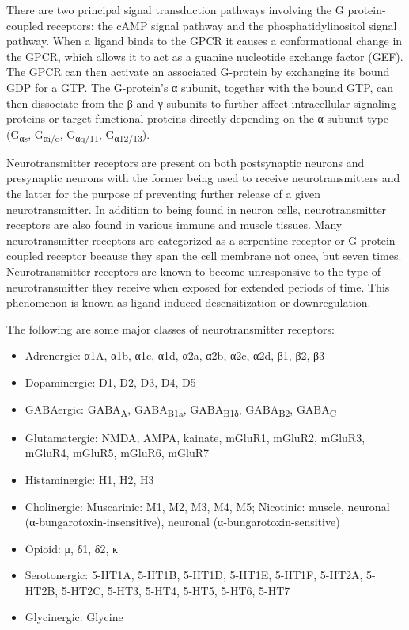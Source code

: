 There are two principal signal transduction pathways involving the G protein-coupled receptors: the cAMP signal pathway and the phosphatidylinositol signal pathway. When a ligand binds to the GPCR it causes a conformational change in the GPCR, which allows it to act as a guanine nucleotide exchange factor (GEF). The GPCR can then activate an associated G-protein by exchanging its bound GDP for a GTP. The G-protein's α subunit, together with the bound GTP, can then dissociate from the β and γ subunits to further affect intracellular signaling proteins or target functional proteins directly depending on the α subunit type (G\textsubscript{αs}, G\textsubscript{αi/o}, G\textsubscript{αq/11}, G\textsubscript{α12/13}).

Neurotransmitter receptors are present on both postsynaptic neurons and presynaptic neurons with the former being used to receive neurotransmitters and the latter for the purpose of preventing further release of a given neurotransmitter. In addition to being found in neuron cells, neurotransmitter receptors are also found in various immune and muscle tissues. Many neurotransmitter receptors are categorized as a serpentine receptor or G protein-coupled receptor because they span the cell membrane not once, but seven times. Neurotransmitter receptors are known to become unresponsive to the type of neurotransmitter they receive when exposed for extended periods of time. This phenomenon is known as ligand-induced desensitization or downregulation.

The following are some major classes of neurotransmitter receptors:

\begin{itemize}
\tightlist
\item
  Adrenergic: α1A, α1b, α1c, α1d, α2a, α2b, α2c, α2d, β1, β2, β3
\item
  Dopaminergic: D1, D2, D3, D4, D5
\item
  GABAergic: GABA\textsubscript{A}, GABA\textsubscript{B1a}, GABA\textsubscript{B1δ}, GABA\textsubscript{B2}, GABA\textsubscript{C}
\item
  Glutamatergic: NMDA, AMPA, kainate, mGluR1, mGluR2, mGluR3, mGluR4, mGluR5, mGluR6, mGluR7
\item
  Histaminergic: H1, H2, H3
\item
  Cholinergic: Muscarinic: M1, M2, M3, M4, M5; Nicotinic: muscle, neuronal (α-bungarotoxin-insensitive), neuronal (α-bungarotoxin-sensitive)
\item
  Opioid: μ, δ1, δ2, κ
\item
  Serotonergic: 5-HT1A, 5-HT1B, 5-HT1D, 5-HT1E, 5-HT1F, 5-HT2A, 5-HT2B, 5-HT2C, 5-HT3, 5-HT4, 5-HT5, 5-HT6, 5-HT7
\item
  Glycinergic: Glycine
\end{itemize}

